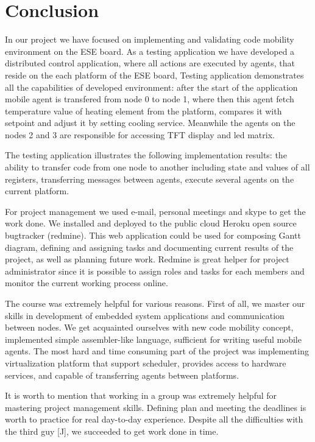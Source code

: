 \documentclass{scrreprt}
\begin{document}
\chapter{Conclusion}

In our project we have focused on implementing and validating code mobility environment
on the ESE board. As a testing application we have developed a distributed control application,
where all actions are executed by agents, that reside on the each platform of the ESE board,
Testing application demonstrates all the capabilities of developed environment:
after the start of the application mobile agent is transfered from node 0 to node 1, where then 
this agent fetch temperature value of heating element from the platform, compares it with setpoint and
adjust it by setting cooling service.
Meanwhile the agents on the nodes 2 and 3 are responsible for accessing TFT display and led matrix.


The testing application illustrates the following implementation results: the  ability to transfer code from
one node to another including state and values of all registers,
transferring messages between agents, execute several agents on the current platform.


For project management we used e-mail, personal meetings and skype to get the work done.
We installed and deployed to the public cloud Heroku
open source bugtracker (redmine). This web application could be used for composing Gantt diagram,
defining and assigning tasks and documenting current results of the project, as well as
planning future work.
Redmine is great helper for project administrator since it is possible to assign 
roles and tasks for each members and monitor the current working process online.


The course was extremely helpful for various reasons.
First of all, we master our skills in development of embedded system applications and 
communication between nodes.
We get acquainted ourselves with new code mobility concept, implemented simple
assembler-like language, sufficient for writing useful mobile agents.
The most hard and time consuming part of the project was implementing
virtualization platform that support scheduler, provides access to hardware services,
and capable of transferring agents between platforms.


It is worth to mention that working in a group was extremely helpful for mastering project
management skills. Defining plan and meeting the deadlines is worth to practice 
for real day-to-day experience. Despite all the difficulties with the third guy [J],
we succeeded to get work done in time.
\end{document}
